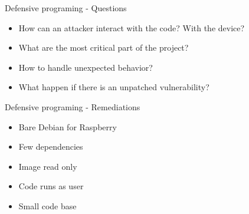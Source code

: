 \begin{frame}[fragile]{Defensive programing - Questions}
    \begin{itemize}
        \item How can an attacker interact with the code? With the device?
        \item What are the most critical part of the project?
        \item How to handle unexpected behavior?
        \item What happen if there is an unpatched vulnerability?
   \end{itemize}
\end{frame}

\begin{frame}[fragile]{Defensive programing - Remediations}
    \begin{itemize}
        \item Bare Debian for Raspberry
        \item Few dependencies
        \item Image read only
        \item Code runs as user
        \item Small code base
   \end{itemize}
\end{frame}


